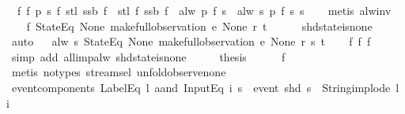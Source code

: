 \begin{isabellebody}
\ \ f{}{\isacharcolon}\ {\isachardoublequoteopen}{\isasymforall}f\ p\ s{\isachardot}\ f\ {\isacharparenleft}stl\ {\isacharparenleft}ssb\ f{\isacharparenright}{\isacharparenright}\ {\isasymnoteq}\ stl\ {\isacharparenleft}f\ {\isacharparenleft}ssb\ f{\isacharparenright}{\isacharparenright}\ {\isasymor}\ alw\ p\ {\isacharparenleft}f\ s{\isacharparenright}\ {\isacharequal}\ alw\ {\isacharparenleft}{\isasymlambda}s{\isachardot}\ p\ {\isacharparenleft}f\ s{\isacharparenright}{\isacharparenright}\ s{\isachardoublequoteclose}\isanewline
\ \ \isamarkupfalse%
\ {\isacharparenleft}metis\ alw{\isacharunderscore}inv{\isacharparenright}\isanewline
\ \ \isamarkupfalse%
\ f{}{\isacharcolon}\ {\isachardoublequoteopen}StateEq\ None\ {\isacharparenleft}make{\isacharunderscore}full{\isacharunderscore}observation\ e\ None\ r\ t{\isacharparenright}{\isachardoublequoteclose}\isanewline
\ \ \ \ \isamarkupfalse%
\ shd{\isacharunderscore}state{\isacharunderscore}is{\isacharunderscore}none\ \isamarkupfalse%
\ auto\isanewline
{}\isamarkupfalse%
\ \isamarkupfalse%
\ {\isachardoublequoteopen}alw\ {\isacharparenleft}{\isasymlambda}s{\isachardot}\ StateEq\ None\ {\isacharparenleft}make{\isacharunderscore}full{\isacharunderscore}observation\ e\ None\ r\ s{\isacharparenright}{\isacharparenright}\ t{\isachardoublequoteclose}\isanewline
\ \ \isamarkupfalse%
\ f{}\ f{}\ f{}\isanewline
\ \ \isamarkupfalse%
\ {\isacharparenleft}simp\ add{\isacharcolon}\ all{\isacharunderscore}imp{\isacharunderscore}alw\ shd{\isacharunderscore}state{\isacharunderscore}is{\isacharunderscore}none{\isacharparenright}\isanewline
\ \ \isamarkupfalse%
\ \isamarkupfalse%
\ {\isacharquery}thesis\isanewline
\ \ \ \ \isamarkupfalse%
\ f{}\ \isamarkupfalse%
\ {\isacharparenleft}metis\ {\isacharparenleft}no{\isacharunderscore}types{\isacharparenright}\ stream{\isachardot}sel{\isacharparenleft}{}{\isacharparenright}\ unfold{\isacharunderscore}observe{\isacharunderscore}none{\isacharparenright}\isanewline
{}\isamarkupfalse%
%
\endisatagproof
{\isafoldproof}%
%
\isadelimproof
\isanewline
%
\endisadelimproof
\isanewline
{}\isamarkupfalse%
\ event{\isacharunderscore}components{\isacharcolon}\ {\isachardoublequoteopen}{\isacharparenleft}LabelEq\ l\ aand\ InputEq\ i{\isacharparenright}\ s\ {\isacharequal}\ {\isacharparenleft}event\ {\isacharparenleft}shd\ s{\isacharparenright}\ {\isacharequal}\ {\isacharparenleft}String{\isachardot}implode\ l{\isacharcomma}\ i{\isacharparenright}{\isacharparenright}{\isachardoublequoteclose}\isanewline

\end{isabellebody}
